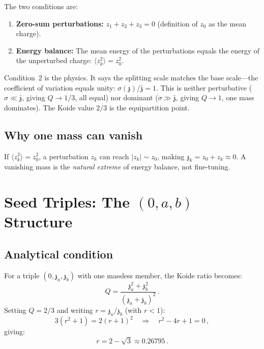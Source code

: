 \documentclass[12pt,a4paper]{article}
\newcommand{\zch}{\mathfrak{z}}
\begin{document}
The two conditions are:
\begin{enumerate}
\item \textbf{Zero-sum perturbations:} $z_1 + z_2 + z_3 = 0$ 
(definition of $z_0$ as the mean charge).
\item \textbf{Energy balance:} The mean energy of the perturbations 
equals the energy of the unperturbed charge: 
$\langle z_k^2\rangle = z_0^2$.
\end{enumerate}

Condition~2 is the physics. It says the splitting scale matches the 
base scale---the coefficient of variation equals unity: 
$\sigma(\zch)/\bar{\zch} = 1$. This is neither perturbative 
($\sigma \ll \bar{\zch}$, giving $Q \to 1/3$, all equal) nor 
dominant ($\sigma \gg \bar{\zch}$, giving $Q \to 1$, one mass 
dominates). The Koide value $2/3$ is the equipartition point.

\subsection{Why one mass can vanish}

If $\langle z_k^2\rangle = z_0^2$, a perturbation $z_k$ can reach 
$|z_k| \sim z_0$, making $\zch_k = z_0 + z_k \approx 0$. A vanishing 
mass is the \emph{natural extreme} of energy balance, not fine-tuning.

\section{Seed Triples: The $(0, a, b)$ Structure}
\label{sec:seeds}

\subsection{Analytical condition}

For a triple $(0, \zch_a, \zch_b)$ with one massless member, the 
Koide ratio becomes:
\begin{equation}
Q = \frac{\zch_a^2 + \zch_b^2}{(\zch_a + \zch_b)^2}\,.
\end{equation}
Setting $Q = 2/3$ and writing $r = \zch_a/\zch_b$ (with $r < 1$):
\begin{equation}
3(r^2 + 1) = 2(r + 1)^2 \quad\Longrightarrow\quad r^2 - 4r + 1 = 0\,,
\end{equation}
giving:
\begin{equation}
\boxed{r = 2 - \sqrt{3} \approx 0.26795\,.}
\end{equation}
\end{document}
